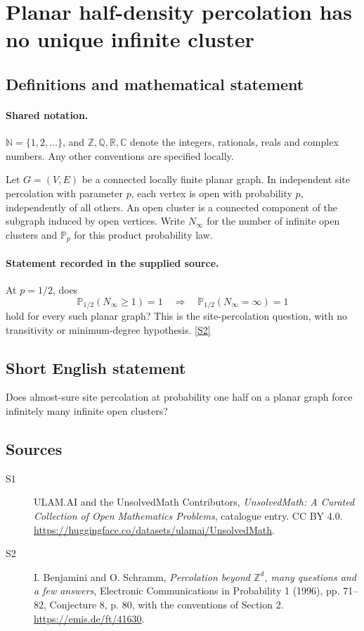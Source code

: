\documentclass[11pt]{article}
\newcommand{\sref}[2]{\hyperlink{source:#1:#2}{[S#2]}}
\begin{document}
\section{Planar half-density percolation has no unique infinite cluster}\label{statement}

\subsection{Definitions and mathematical statement}

\paragraph{Shared notation.}$\mathbb N=\{1,2,\ldots\}$, and $\mathbb Z,\mathbb Q,\mathbb R,\mathbb C$ denote the integers, rationals, reals and complex numbers. Any other conventions are specified locally.


Let $G=(V,E)$ be a connected locally finite planar graph. In independent site percolation with parameter $p$, each vertex is open with probability $p$, independently of all others. An open cluster is a connected component of the subgraph induced by open vertices. Write $N_\infty$ for the number of infinite open clusters and $\mathbb P_p$ for this product probability law.
\paragraph{Statement recorded in the supplied source.}
At $p=1/2$, does
\[\mathbb P_{1/2}(N_\infty\ge1)=1\quad\Longrightarrow\quad\mathbb P_{1/2}(N_\infty=\infty)=1\]
hold for every such planar graph? This is the site-percolation question, with no transitivity or minimum-degree hypothesis. \sref{statement}{2}
\subsection{Short English statement}
Does almost-sure site percolation at probability one half on a planar graph force infinitely many infinite open clusters?
\subsection{Sources}
\begin{description}
\item[\hypertarget{source:statement:1}{S1}] ULAM.AI and the UnsolvedMath Contributors, \emph{UnsolvedMath: A Curated Collection of Open Mathematics Problems}, catalogue entry. CC BY 4.0. \url{https://huggingface.co/datasets/ulamai/UnsolvedMath}.
\item[\hypertarget{source:statement:2}{S2}] I. Benjamini and O. Schramm, \emph{Percolation beyond $\mathbb Z^d$, many questions and a few answers}, Electronic Communications in Probability 1 (1996), pp. 71--82, Conjecture 8, p. 80, with the conventions of Section 2. \url{https://emis.de/ft/41630}.
\end{description}
\label{end:statement}
\end{document}
